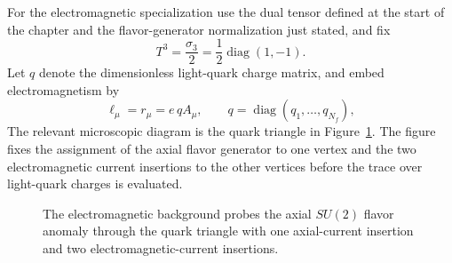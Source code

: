 For the electromagnetic specialization use the dual tensor defined at the start
of the chapter and the flavor-generator normalization just stated, and fix
\[
  T^3=\frac{\sigma_3}{2}
  =
  \frac12\operatorname{diag}(1,-1).
\]
Let \(q\) denote the dimensionless light-quark charge matrix, and embed
electromagnetism by
\[
  \ell_\mu=r_\mu=e\,q A_\mu,
  \qquad
  q=\operatorname{diag}(q_1,\ldots,q_{N_f}),
\]
The relevant microscopic diagram is the quark triangle in
Figure~\ref{fig:em-axial-flavor-triangle}.  The figure fixes the assignment of
the axial flavor generator to one vertex and the two electromagnetic current
insertions to the other vertices before the trace over light-quark charges is
evaluated.
\begin{figure}[H]
  \centering
  \caption{The electromagnetic background probes the axial \(SU(2)\) flavor
  anomaly through the quark triangle with one axial-current insertion and two
  electromagnetic-current insertions.}
  \label{fig:em-axial-flavor-triangle}
\end{figure}
